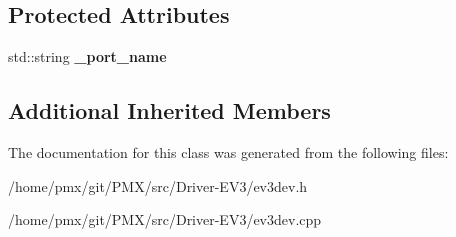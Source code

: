 \subsection*{Protected Attributes}
\begin{DoxyCompactItemize}
\item 
\mbox{\label{classev3dev_1_1dc__motor_a7896077a00c4aacd7cc92cd62220c708}} 
std\+::string {\bfseries \+\_\+port\+\_\+name}
\end{DoxyCompactItemize}
\subsection*{Additional Inherited Members}


The documentation for this class was generated from the following files\+:\begin{DoxyCompactItemize}
\item 
/home/pmx/git/\+P\+M\+X/src/\+Driver-\/\+E\+V3/ev3dev.\+h\item 
/home/pmx/git/\+P\+M\+X/src/\+Driver-\/\+E\+V3/ev3dev.\+cpp\end{DoxyCompactItemize}
